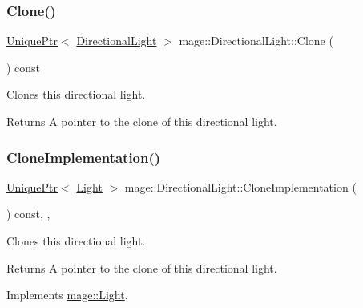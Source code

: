 \subsubsection{\texorpdfstring{Clone()}{Clone()}}
{\footnotesize\ttfamily \hyperlink{namespacemage_a3316d7143a973e37adf1110f2e80ca31}{Unique\+Ptr}$<$ \hyperlink{classmage_1_1_directional_light}{Directional\+Light} $>$ mage\+::\+Directional\+Light\+::\+Clone (\begin{DoxyParamCaption}{ }\end{DoxyParamCaption}) const}

Clones this directional light.

\begin{DoxyReturn}{Returns}
A pointer to the clone of this directional light. 
\end{DoxyReturn}
\hypertarget{classmage_1_1_directional_light_a122d3dcd7633a85ef8a85e7d768da36d}{}\label{classmage_1_1_directional_light_a122d3dcd7633a85ef8a85e7d768da36d} 
\subsubsection{\texorpdfstring{Clone\+Implementation()}{CloneImplementation()}}
{\footnotesize\ttfamily \hyperlink{namespacemage_a3316d7143a973e37adf1110f2e80ca31}{Unique\+Ptr}$<$ \hyperlink{classmage_1_1_light}{Light} $>$ mage\+::\+Directional\+Light\+::\+Clone\+Implementation (\begin{DoxyParamCaption}{ }\end{DoxyParamCaption}) const\hspace{0.3cm}{\ttfamily [override]}, {\ttfamily [private]}, {\ttfamily [virtual]}}

Clones this directional light.

\begin{DoxyReturn}{Returns}
A pointer to the clone of this directional light. 
\end{DoxyReturn}


Implements \hyperlink{classmage_1_1_light_aa613d76a1ebda69efde853d15f75490c}{mage\+::\+Light}.

\hypertarget{classmage_1_1_directional_light_addd4803dee85892dfd57f51e155c6572}{}\label{classmage_1_1_directional_light_addd4803dee85892dfd57f51e155c6572} 
